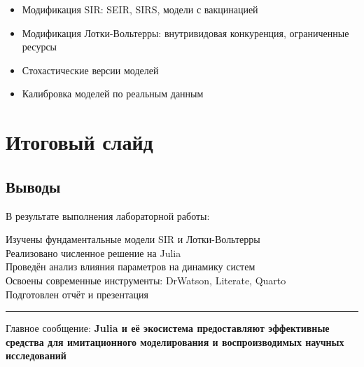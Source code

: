 \documentclass[
  letterpaper,
  DIV=11,
  numbers=noendperiod]{scrartcl}
\providecommand{\tightlist}{%
  \setlength{\itemsep}{0pt}\setlength{\parskip}{0pt}}\usepackage{longtable,booktabs,array}
\begin{document}
\begin{itemize}
\tightlist
\item
  Модификация SIR: SEIR, SIRS, модели с вакцинацией
\item
  Модификация Лотки-Вольтерры: внутривидовая конкуренция, ограниченные
  ресурсы
\item
  Стохастические версии моделей
\item
  Калибровка моделей по реальным данным
\end{itemize}

\section{Итоговый
слайд}\label{ux438ux442ux43eux433ux43eux432ux44bux439-ux441ux43bux430ux439ux434}

\subsection{Выводы}\label{ux432ux44bux432ux43eux434ux44b}

В результате выполнения лабораторной работы:

Изучены фундаментальные модели SIR и Лотки-Вольтерры\\
Реализовано численное решение на Julia\\
Проведён анализ влияния параметров на динамику систем\\
Освоены современные инструменты: DrWatson, Literate, Quarto\\
Подготовлен отчёт и презентация

\begin{center}\rule{0.5\linewidth}{0.5pt}\end{center}

Главное сообщение: \textbf{Julia и её экосистема предоставляют
эффективные средства для имитационного моделирования и воспроизводимых
научных исследований}
\end{document}
